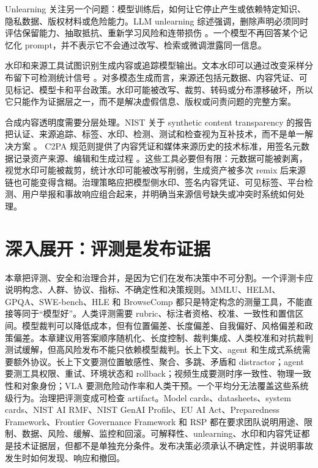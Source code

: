 \documentclass[UTF8,zihao=-4,openany]{ctexbook}
\begin{document}
Unlearning 关注另一个问题：模型训练后，如何让它停止产生或依赖特定知识、隐私数据、版权材料或危险能力。LLM unlearning 综述强调，删除声明必须同时评估保留能力、抽取抵抗、重新学习风险和连带损伤 \cite{qiu2025unlearning}。一个模型不再回答某个记忆化 prompt，并不表示它不会通过改写、检索或微调泄露同一信息。

水印和来源工具试图识别生成内容或追踪模型输出。文本水印可以通过改变采样分布留下可检测统计信号 \cite{kirchenbauer2023watermark}。对多模态生成而言，来源还包括元数据、内容凭证、可见标记、模型卡和平台政策。水印可能被改写、裁剪、转码或分布漂移破坏，所以它只能作为证据层之一，而不是解决虚假信息、版权或问责问题的完整方案。

合成内容透明度需要分层处理。NIST 关于 synthetic content transparency 的报告把认证、来源追踪、标签、水印、检测、测试和检查视为互补技术，而不是单一解决方案 \cite{nist2024syntheticcontent}。 C2PA 规范则提供了内容凭证和媒体来源历史的技术标准，用签名元数据记录资产来源、编辑和生成过程 \cite{c2pa2026spec}。这些工具必要但有限：元数据可能被剥离，视觉水印可能被裁剪，统计水印可能被改写削弱，生成资产被多次 remix 后来源链也可能变得含糊。治理策略应把模型侧水印、签名内容凭证、可见标签、平台检测、用户举报和事故响应组合起来，并明确当来源信号缺失或冲突时系统如何处理。

\section{深入展开：评测是发布证据}
本章把评测、安全和治理合并，是因为它们在发布决策中不可分割。一个评测卡应说明构念、人群、协议、指标、不确定性和决策规则。MMLU、HELM、GPQA、SWE-bench、HLE 和 BrowseComp 都只是特定构念的测量工具，不能直接等同于“模型好”。人类评测需要 rubric、标注者资格、校准、一致性和置信区间。模型裁判可以降低成本，但有位置偏差、长度偏差、自我偏好、风格偏差和政策偏差。本章建议用答案顺序随机化、长度控制、裁判集成、人类校准和对抗裁判测试缓解，但高风险发布不能只依赖模型裁判。长上下文、agent 和生成式系统需要额外协议。长上下文要测位置敏感性、聚合、多跳、矛盾和 distractor；agent 要测工具权限、重试、环境状态和 rollback；视频生成要测时序一致性、物理一致性和对象身份；VLA 要测危险动作率和人类干预。一个平均分无法覆盖这些系统级行为。治理把评测变成可检查 artifact。Model cards、datasheets、system cards、NIST AI RMF、NIST GenAI Profile、EU AI Act、Preparedness Framework、Frontier Governance Framework 和 RSP 都在要求团队说明用途、限制、数据、风险、缓解、监控和回滚。可解释性、unlearning、水印和内容凭证都是技术证据层，但都不是单独充分条件。发布决策必须承认不确定性，并说明事故发生时如何发现、响应和撤回。
\end{document}
